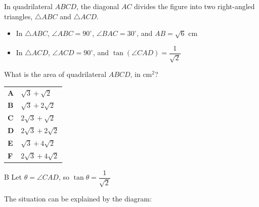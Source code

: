 \documentclass[11pt,a4paper]{article}
\begin{document}
\begin{enumerate}[label=\textbf{\arabic*.},leftmargin=*,itemsep=0pt,start=2]
\questionitem[Trigonometry]
In quadrilateral $ABCD$, the diagonal $AC$ divides the figure into two right-angled triangles, $\triangle ABC$ and $\triangle ACD$.

\begin{itemize}
    \item In $\triangle ABC$, $\angle ABC = 90^\circ$, $\angle BAC = 30^\circ$, and $AB = \sqrt{6}\text{ cm}$
    \item In $\triangle ACD$, $\angle ACD = 90^\circ$, and $\tan(\angle CAD) = \dfrac{1}{\sqrt{2}}$
\end{itemize}

What is the area of quadrilateral $ABCD$, in $\text{cm}^2$? \\

\par\vspace*{12pt}
\begin{tabularx}{\linewidth}{@{}>{\bfseries}l Y@{}}
A &
$\sqrt{3} + \sqrt{2}$
\\[0.8em]
B &
$\sqrt{3} + 2\sqrt{2}$
\\[0.8em]
C &
$2\sqrt{3} + \sqrt{2}$
\\[0.8em]
D &
$2\sqrt{3} + 2\sqrt{2}$
\\[0.8em]
E &
$\sqrt{3} + 4\sqrt{2}$
\\[0.8em]
F &
$2\sqrt{3} + 4\sqrt{2}$
\\
\end{tabularx}

\begin{djsSolution}{B}
Let $\theta=\angle CAD$, so $\tan\theta=\dfrac{1}{\sqrt{2}}$

The situation can be explained by the diagram:

\begin{djsSolutionFigure}
\end{djsSolutionFigure}
\end{djsSolution}
\end{enumerate}
\end{document}
